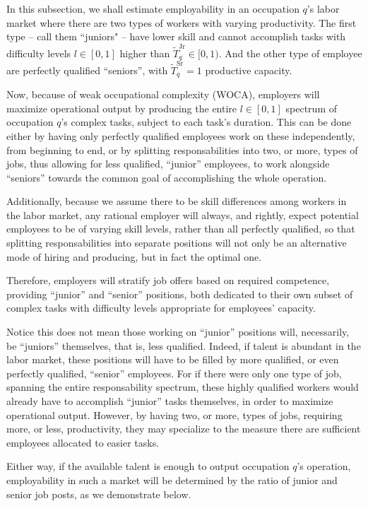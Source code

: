 \documentclass[hidelinks, nonatbib]{elsarticle}
\begin{document}
In this subsection, we shall estimate employability in an occupation $q$'s labor market where there are two types of workers with varying productivity. The first type -- call them ``juniors" -- have lower skill and cannot accomplish tasks with difficulty levels $l \in [0,1]$ higher than $\tilde{T}_{q}^{\text{Jr}} \in [0,1)$. And the other type of employee are perfectly qualified ``seniors'', with $\tilde{T}_{q}^{\text{Sr}} = 1$ productive capacity.

Now, because of weak occupational complexity (WOCA), employers will maximize operational output by producing the entire $l \in [0,1]$ spectrum of occupation $q$'s complex tasks, subject to each task's duration. This can be done either by having only perfectly qualified employees work on these independently, from beginning to end, or by splitting responsabilities into two, or more, types of jobs, thus allowing for less qualified, ``junior'' employees, to work alongside ``seniors'' towards the common goal of accomplishing the whole operation.

Additionally, because we assume there to be skill differences among workers in the labor market, any rational employer will always, and rightly, expect potential employees to be of varying skill levels, rather than all perfectly qualified, so that splitting responsabilities into separate positions will not only be an alternative mode of hiring and producing, but in fact the optimal one.

Therefore, employers will stratify job offers based on required competence, providing ``junior'' and ``senior'' positions, both dedicated to their own subset of complex tasks with difficulty levels appropriate for employees' capacity.

Notice this does not mean those working on ``junior'' positions will, necessarily, be ``juniors'' themselves, that is, less qualified. Indeed, if talent is abundant in the labor market, these positions will have to be filled by more qualified, or even perfectly qualified, ``senior'' employees. For if there were only one type of job, spanning the entire responsability spectrum, these highly qualified workers would already have to accomplish ``junior'' tasks themselves, in order to maximize operational output. However, by having two, or more, types of jobs, requiring more, or less, productivity, they may specialize to the measure there are sufficient employees allocated to easier tasks.

Either way, if the available talent is enough to output occupation $q$'s operation, employability in such a market will be determined by the ratio of junior and senior job posts, as we demonstrate below.
\end{document}
